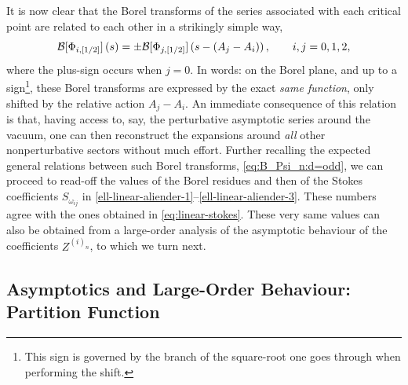 \documentclass[11pt,a4paper]{article}
\newcommand{\CB}{{\cal B}}
\newcommand{\be}{\begin{equation}}
\newcommand{\ee}{\end{equation}}
\begin{document}
It is now clear that the Borel transforms of the series associated with each critical point are related to each other in a strikingly simple way,
%
\be
\CB [\Phi_{i,[1/2]}] \left(s\right) = \pm \CB [\Phi_{j,[1/2]}] \left(s-\left( A_j-A_i\right)\right), \qquad i,j=0,1,2,  
\ee
%
\noindent
where the plus-sign occurs when $j=0$. In words: on the Borel plane, and up to a sign\footnote{This sign is governed by the branch of the square-root one goes through when performing the shift.}, these Borel transforms are expressed by the exact \textit{same function}, only shifted by the relative action $A_j-A_i$. An immediate consequence of this relation is that, having access to, say, the perturbative asymptotic series around the vacuum, one can then reconstruct the expansions around \textit{all} other nonperturbative sectors without much effort. Further recalling the expected general relations between such Borel transforms, \eqref{eq:B_Psi_n:d=odd}, we can proceed to read-off the values of the Borel residues and then of the Stokes coefficients $S_{\omega_{ij}}$ in \eqref{ell-linear-aliender-1}--\eqref{ell-linear-aliender-3}. These numbers agree with the ones obtained in \eqref{eq:linear-stokes}. These very same values can also be obtained from a large-order analysis of the asymptotic behaviour of the coefficients $Z^{(i)_n}$, to which we turn next.

\subsection{Asymptotics and Large-Order Behaviour: Partition Function}\label{sec:linear_ode}
\end{document}
